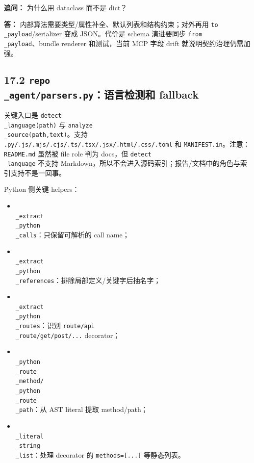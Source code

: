 \documentclass[UTF8,12pt,openany]{ctexbook}
\begin{document}
\textbf{追问：} 为什么用 dataclass 而不是 dict？\par

\textbf{答：} 内部算法需要类型/属性补全、默认列表和结构约束；对外再用 \texttt{to\\_payload}/serializer 变成 JSON。代价是 schema 演进要同步 \texttt{from\\_payload}、bundle renderer 和测试，当前 MCP 字段 drift 就说明契约治理仍需加强。\par

\subsection{17.2 \texttt{repo\\_agent/parsers.py}：语言检测和 fallback}

关键入口是 \texttt{detect\\_language(path)} 与 \texttt{analyze\\_source(path,text)}。支持 \texttt{.py/.js/.mjs/.cjs/.ts/.tsx/.jsx/.html/.css/.toml} 和 \texttt{MANIFEST.in}。注意：\texttt{README.md} 虽然被 file role 判为 docs，但 \texttt{detect\\_language} 不支持 Markdown，所以不会进入源码索引；报告/文档中的角色与索引支持不是一回事。\par

Python 侧关键 helpers：\par

\begin{itemize}
\item \texttt{\\_extract\\_python\\_calls}：只保留可解析的 call name；
\item \texttt{\\_extract\\_python\\_references}：排除局部定义/关键字后抽名字；
\item \texttt{\\_extract\\_python\\_routes}：识别 \texttt{route/api\\_route/get/post/...} decorator；
\item \texttt{\\_python\\_route\\_method/\\_python\\_route\\_path}：从 AST literal 提取 method/path；
\item \texttt{\\_literal\\_string\\_list}：处理 decorator 的 \texttt{methods=[...]} 等静态列表。
\end{itemize}
\end{document}
